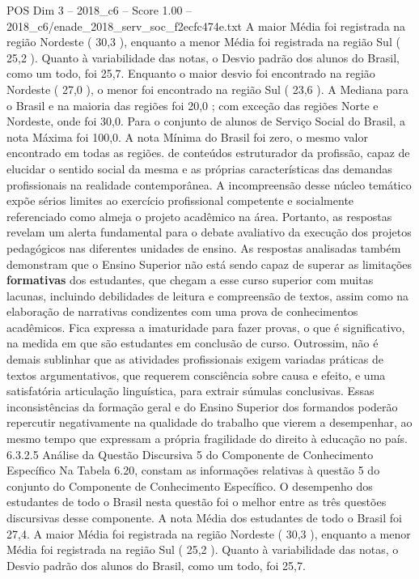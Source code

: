 \begin{textsample}{POS Dim 3 – 2018\_c6 – Score 1.00 – 2018\_c6/enade\_2018\_serv\_soc\_f2ecfc474e.txt}
A maior Média foi registrada na região Nordeste ( 30,3 ), enquanto a menor Média foi registrada na região Sul ( 25,2 ).
Quanto à variabilidade das notas, o Desvio padrão dos alunos do Brasil, como um todo, foi 25,7.
Enquanto o maior desvio foi encontrado na região Nordeste ( 27,0 ), o menor foi encontrado na região Sul ( 23,6 ).
A Mediana para o Brasil e na maioria das regiões foi 20,0 ; com exceção das regiões Norte e Nordeste, onde foi 30,0.
Para o conjunto de alunos de Serviço Social do Brasil, a nota Máxima foi 100,0.
A nota Mínima do Brasil foi zero, o mesmo valor encontrado em todas as regiões. de conteúdos estruturador da profissão, capaz de elucidar o sentido social da mesma e as próprias características das demandas profissionais na realidade contemporânea.
A incompreensão desse núcleo temático expõe sérios limites ao exercício profissional competente e socialmente referenciado como almeja o projeto acadêmico na área.
Portanto, as respostas revelam um alerta fundamental para o debate avaliativo da execução dos projetos pedagógicos nas diferentes unidades de ensino.
As respostas analisadas também demonstram que o Ensino Superior não está sendo capaz de superar as limitações \textbf{formativas} dos estudantes, que chegam a esse curso superior com muitas lacunas, incluindo debilidades de leitura e compreensão de textos, assim como na elaboração de narrativas condizentes com uma prova de conhecimentos acadêmicos.
Fica expressa a imaturidade para fazer provas, o que é significativo, na medida em que são estudantes em conclusão de curso.
Outrossim, não é demais sublinhar que as atividades profissionais exigem variadas práticas de textos argumentativos, que requerem consciência sobre causa e efeito, e uma satisfatória articulação linguística, para extrair súmulas conclusivas.
Essas inconsistências da formação geral e do Ensino Superior dos formandos poderão repercutir negativamente na qualidade do trabalho que vierem a desempenhar, ao mesmo tempo que expressam a própria fragilidade do direito à educação no país. 6.3.2.5 Análise da Questão Discursiva 5 do Componente de Conhecimento Específico Na Tabela 6.20, constam as informações relativas à questão 5 do conjunto do Componente de Conhecimento Específico.
O desempenho dos estudantes de todo o Brasil nesta questão foi o melhor entre as três questões discursivas desse componente.
A nota Média dos estudantes de todo o Brasil foi 27,4.
A maior Média foi registrada na região Nordeste ( 30,3 ), enquanto a menor Média foi registrada na região Sul ( 25,2 ).
Quanto à variabilidade das notas, o Desvio padrão dos alunos do Brasil, como um todo, foi 25,7.

\end{textsample}

